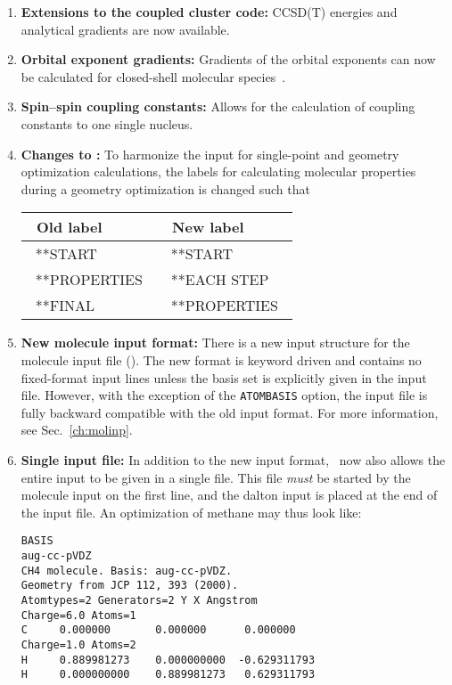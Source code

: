 \begin{enumerate}
\item{\bf Extensions to the coupled cluster code:} CCSD(T) energies
  and analytical gradients are now available.

\item{\bf Orbital exponent gradients:} Gradients of the orbital
exponents can now be calculated for closed-shell molecular
species~\cite{fjthjcp121}.

\item{\bf Spin--spin coupling constants:} Allows for the calculation
  of coupling constants to one single nucleus.

\item{\bf Changes to \dalinp:} To harmonize the input for
  single-point and geometry optimization calculations, the labels for
  calculating  molecular properties during a geometry optimization is
  changed such that

\begin{center}
\begin{tabular}{|l|l|}\hline
\ Old label     & \ New label     \\\hline
\ **START       & \ **START       \\
\ **PROPERTIES\ & \ **EACH STEP   \\
\ **FINAL       & \ **PROPERTIES\ \\\hline
\end{tabular}
\end{center}

\item{\bf New molecule input format:} There is a new input structure
  for the molecule input file (\molinp). The new format is keyword driven and
  contains no fixed-format input lines unless the basis set is
  explicitly given in the input file. However, with the exception of
  the \verb|ATOMBASIS| option, the input file is fully backward
  compatible with the old input format. For more information, see
  Sec.~\ref{ch:molinp}.

\item{\bf Single input file:} In addition to the new input format,
  \dalton\ now also allows the entire input to be given in a
  single file. This file {\em must} be started by the molecule input on the
  first line, and the dalton input is placed at the end of the input
  file. An optimization of methane may thus look like:

\begin{verbatim}
BASIS
aug-cc-pVDZ
CH4 molecule. Basis: aug-cc-pVDZ.
Geometry from JCP 112, 393 (2000).
Atomtypes=2 Generators=2 Y X Angstrom
Charge=6.0 Atoms=1
C     0.000000       0.000000      0.000000
Charge=1.0 Atoms=2
H     0.889981273    0.000000000  -0.629311793
H     0.000000000    0.889981273   0.629311793


\end{verbatim}
\end{enumerate}
